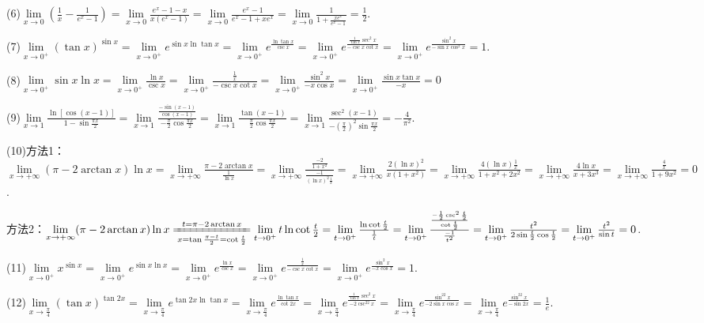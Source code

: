 \documentclass[12pt,UTF8]{ctexart}
\begin{document}
\begin{enumerate}
(6)$\lim\limits_{x\rightarrow0}(\frac1x-\frac1{e^x-1})=\lim\limits_{x\rightarrow0}\frac{e^x-1-x}{x(e^x-1)}=\lim\limits_{x\rightarrow0}\frac{e^x-1}{e^x-1+xe^x}=\lim\limits_{x\rightarrow0}\frac1{1+\frac{xe^x}{e^x-1}}=\frac12$.

(7)$\lim\limits_{x\rightarrow0^+}(\tan x)^{\sin x}=\lim\limits_{x\rightarrow0^+}e^{\sin x\ln\tan x}=\lim\limits_{x\rightarrow0^+}e^{\frac{\ln\tan x}{\csc x}}=\lim\limits_{x\rightarrow0^+}e^{\frac{\frac1{\tan x}\sec^2x}{-\csc x\cot x}}=\lim\limits_{x\rightarrow0^+}e^{\frac{\sin^2x}{-\sin x\cos^2x}}=1$.

(8)$\lim\limits_{x\rightarrow0^+}\sin x\ln x=\lim\limits_{x\rightarrow0^+}\frac{\ln x}{\csc x}=\lim\limits_{x\rightarrow0^+}\frac{\frac1x}{-\csc x\cot x}=\lim\limits_{x\rightarrow0^+}\frac{\sin^2x}{-x\cos x}=\lim\limits_{x\rightarrow0^+}\frac{\sin x\tan x}{-x}=0$

(9)$\lim\limits_{x\rightarrow1}\frac{\ln[\cos(x-1)]}{1-\sin\frac{\pi x}2}=\lim\limits_{x\rightarrow1}\frac{\frac{-\sin(x-1)}{\cos(x-1)}}{-\frac\pi2\cos\frac{\pi x}2}=\lim\limits_{x\rightarrow1}\frac{\tan(x-1)}{\frac\pi2\cos\frac{\pi x}2}=\lim\limits_{x\rightarrow1}\frac{\sec^2(x-1)}{-(\frac\pi2)^2\sin\frac{\pi x}2}=-\frac4{\pi^2}$.

(10)方法1：$\lim\limits_{x\rightarrow+\infty}(\pi-2\arctan x)\ln x=\lim\limits_{x\rightarrow+\infty}\frac{\pi-2\arctan x}{\frac1{\ln x}}=\lim\limits_{x\rightarrow+\infty}\frac{\frac{-2}{1+x^2}}{\frac{-1}{(\ln x)^2\frac1x}}=\lim\limits_{x\rightarrow+\infty}\frac{2(\ln x)^2}{x(1+x^2)}=\lim\limits_{x\rightarrow+\infty}\frac{4(\ln x)\frac1x}{1+x^2+2x^2}=\lim\limits_{x\rightarrow+\infty}\frac{4\ln x}{x+3x^3}=\lim\limits_{x\rightarrow+\infty}\frac{\frac4x}{1+9x^2}=0$.

方法2：$\lim\limits_{x\rightarrow+\infty}(\pi-2\arctan x)\ln x\xlongequal[x=\tan\frac{\pi-t}2=\cot\frac t2]{t=\pi-2\arctan x}\lim\limits_{t\rightarrow0^+}t\ln\cot\frac t2=\lim\limits_{t\rightarrow0^+}\frac{\ln\cot\frac t2}{\frac1t}=\lim\limits_{t\rightarrow0^+}\frac{\frac{-\frac12\csc^2\frac t2}{\cot\frac t2}}{\frac{-1}{t^2}}=\lim\limits_{t\rightarrow0^+}\frac{t^2}{2\sin\frac t2\cos\frac t2}=\lim\limits_{t\rightarrow0^+}\frac{t^2}{\sin t}=0$.

(11)$\lim\limits_{x\rightarrow0^+}x^{\sin x}=\lim\limits_{x\rightarrow0^+}e^{\sin x\ln x}=\lim\limits_{x\rightarrow0^+}e^{\frac{\ln x}{\csc x}}=\lim\limits_{x\rightarrow0^+}e^{\frac{\frac1x}{-\csc x\cot x}}=\lim\limits_{x\rightarrow0^+}e^{\frac{\sin^2x}{-x\cos x}}=1$.

(12)$\lim\limits_{x\rightarrow\frac\pi4}(\tan x)^{\tan2x}=\lim\limits_{x\rightarrow\frac\pi4}e^{\tan2x\ln\tan x}=\lim\limits_{x\rightarrow\frac\pi4}e^{\frac{\ln\tan x}{\cot2x}}=\lim\limits_{x\rightarrow\frac\pi4}e^{\frac{\frac1{\tan x}\sec^2x}{-2\csc^22x}}=\lim\limits_{x\rightarrow\frac\pi4}e^{\frac{\sin^22x}{-2\sin x\cos x}}=\lim\limits_{x\rightarrow\frac\pi4}e^{\frac{\sin^22x}{-\sin2x}}=\frac1e$.


\end{enumerate}
\end{document}

